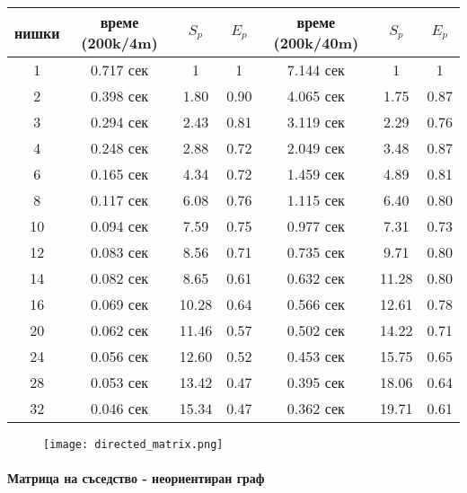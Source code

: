 \begin{center}
\begin{tabular}{ | c | c c c | c c c | }
  нишки & време (200k/4m) & $S_p$ & $E_p$ & време (200k/40m) & $S_p$ & $E_p$ \\
  \hline
  1  & 0.717 сек & 1 & 1 & 7.144 сек & 1 & 1 \\
  2  & 0.398 сек & 1.80 & 0.90 & 4.065 сек & 1.75 & 0.87 \\
  3  & 0.294 сек & 2.43 & 0.81 & 3.119 сек & 2.29 & 0.76 \\
  4  & 0.248 сек & 2.88 & 0.72 & 2.049 сек & 3.48 & 0.87 \\
  6  & 0.165 сек & 4.34 & 0.72 & 1.459 сек & 4.89 & 0.81 \\
  8  & 0.117 сек & 6.08 & 0.76 & 1.115 сек & 6.40 & 0.80 \\
  10 & 0.094 сек & 7.59 & 0.75 & 0.977 сек & 7.31 & 0.73 \\
  12 & 0.083 сек & 8.56 & 0.71 & 0.735 сек & 9.71 & 0.80 \\
  14 & 0.082 сек & 8.65 & 0.61 & 0.632 сек & 11.28 & 0.80 \\
  16 & 0.069 сек & 10.28 & 0.64 & 0.566 сек & 12.61 & 0.78 \\
  20 & 0.062 сек & 11.46 & 0.57 & 0.502 сек & 14.22 & 0.71 \\
  24 & 0.056 сек & 12.60 & 0.52 & 0.453 сек & 15.75 & 0.65 \\
  28 & 0.053 сек & 13.42 & 0.47 & 0.395 сек & 18.06 & 0.64 \\
  32 & 0.046 сек & 15.34 & 0.47 & 0.362 сек & 19.71 & 0.61 \\
\end{tabular}
\end{center}

\begin{figure}[H]
  \centering
  \texttt{[image: directed\_matrix.png]}
\end{figure}

\paragraph*{Матрица на съседство - неориентиран граф}

